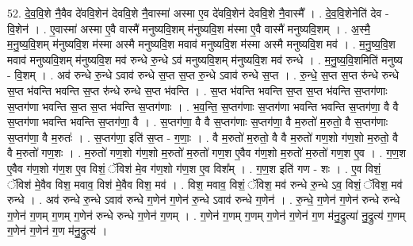 \documentclass[17pt]{extarticle}
\begin{document}
52. दे॒व॒वि॒शे नै॒वैव दे॑ववि॒शेन॑ देववि॒शे नै॒वास्मा॑ अस्मा ए॒व दे॑ववि॒शेन॑ देववि॒शे नै॒वास्मै᳚ । . दे॒व॒वि॒शेनेति॑ देव - वि॒शेन॑ । . ए॒वास्मा॑ अस्मा ए॒वै वास्मै॑ मनुष्यवि॒शम् म॑नुष्यवि॒श म॑स्मा ए॒वै वास्मै॑ मनुष्यवि॒शम् । . अ॒स्मै॒ म॒नु॒ष्य॒वि॒शम् म॑नुष्यवि॒श म॑स्मा अस्मै मनुष्यवि॒श मवाव॑ मनुष्यवि॒श म॑स्मा अस्मै मनुष्यवि॒श मव॑ । . म॒नु॒ष्य॒वि॒श मवाव॑ मनुष्यवि॒शम् म॑नुष्यवि॒श मव॑ रुन्धे रु॒न्धे ऽव॑ मनुष्यवि॒शम् म॑नुष्यवि॒श मव॑ रुन्धे । . म॒नु॒ष्य॒वि॒शमिति॑ मनुष्य - वि॒शम् । . अव॑ रुन्धे रु॒न्धे ऽवाव॑ रुन्धे स॒प्त स॒प्त रु॒न्धे ऽवाव॑ रुन्धे स॒प्त । . रु॒न्धे॒ स॒प्त स॒प्त रु॑न्धे रुन्धे स॒प्त भ॑वन्ति भवन्ति स॒प्त रु॑न्धे रुन्धे स॒प्त भ॑वन्ति । . स॒प्त भ॑वन्ति भवन्ति स॒प्त स॒प्त भ॑वन्ति स॒प्तग॑णाः स॒प्तग॑णा भवन्ति स॒प्त स॒प्त भ॑वन्ति स॒प्तग॑णाः । . भ॒व॒न्ति॒ स॒प्तग॑णाः स॒प्तग॑णा भवन्ति भवन्ति स॒प्तग॑णा॒ वै वै स॒प्तग॑णा भवन्ति भवन्ति स॒प्तग॑णा॒ वै । . स॒प्तग॑णा॒ वै वै स॒प्तग॑णाः स॒प्तग॑णा॒ वै म॒रुतो॑ म॒रुतो॒ वै स॒प्तग॑णाः स॒प्तग॑णा॒ वै म॒रुतः॑ । . स॒प्तग॑णा॒ इति॑ स॒प्त - ग॒णाः॒ । . वै म॒रुतो॑ म॒रुतो॒ वै वै म॒रुतो॑ गण॒शो ग॑ण॒शो म॒रुतो॒ वै वै म॒रुतो॑ गण॒शः । . म॒रुतो॑ गण॒शो ग॑ण॒शो म॒रुतो॑ म॒रुतो॑ गण॒श ए॒वैव ग॑ण॒शो म॒रुतो॑ म॒रुतो॑ गण॒श ए॒व । . ग॒ण॒श ए॒वैव ग॑ण॒शो ग॑ण॒श ए॒व विशं॒ ॅविश॑ मे॒व ग॑ण॒शो ग॑ण॒श ए॒व विश᳚म् । . ग॒ण॒श इति॑ गण - शः । . ए॒व विशं॒ ॅविश॑ मे॒वैव विश॒ मवाव॒ विश॑ मे॒वैव विश॒ मव॑ । . विश॒ मवाव॒ विशं॒ ॅविश॒ मव॑ रुन्धे रु॒न्धे ऽव॒ विशं॒ ॅविश॒ मव॑ रुन्धे । . अव॑ रुन्धे रु॒न्धे ऽवाव॑ रुन्धे ग॒णेन॑ ग॒णेन॑ रु॒न्धे ऽवाव॑ रुन्धे ग॒णेन॑ । . रु॒न्धे॒ ग॒णेन॑ ग॒णेन॑ रुन्धे रुन्धे ग॒णेन॑ ग॒णम् ग॒णम् ग॒णेन॑ रुन्धे रुन्धे ग॒णेन॑ ग॒णम् । . ग॒णेन॑ ग॒णम् ग॒णम् ग॒णेन॑ ग॒णेन॑ ग॒ण म॑नु॒द्रुत्या॑ नु॒द्रुत्य॑ ग॒णम् ग॒णेन॑ ग॒णेन॑ ग॒ण म॑नु॒द्रुत्य॑ । \newline
\end{document}
